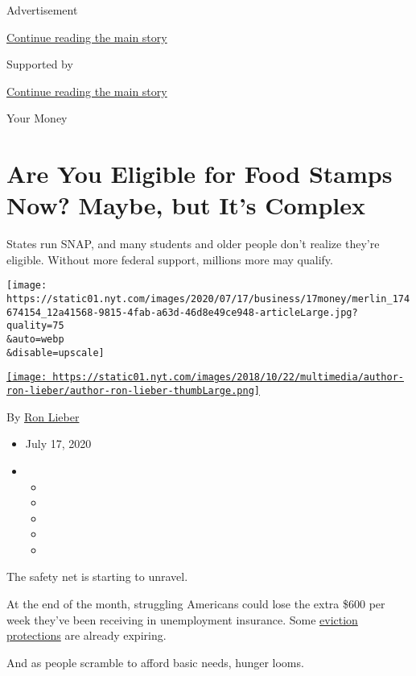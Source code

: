 Advertisement

\protect\hyperlink{after-top}{Continue reading the main story}

Supported by

\protect\hyperlink{after-sponsor}{Continue reading the main story}

Your Money

\hypertarget{are-you-eligible-for-food-stamps-now-maybe-but-its-complex}{%
\section{Are You Eligible for Food Stamps Now? Maybe, but It's
Complex}\label{are-you-eligible-for-food-stamps-now-maybe-but-its-complex}}

States run SNAP, and many students and older people don't realize
they're eligible. Without more federal support, millions more may
qualify.

\texttt{[image: https://static01.nyt.com/images/2020/07/17/business/17money/merlin\_174674154\_12a41568-9815-4fab-a63d-46d8e49ce948-articleLarge.jpg?quality=75\\\&auto=webp\\\&disable=upscale]}

\href{https://www.nytimes.com/by/ron-lieber}{\texttt{[image: https://static01.nyt.com/images/2018/10/22/multimedia/author-ron-lieber/author-ron-lieber-thumbLarge.png]}}

By \href{https://www.nytimes.com/by/ron-lieber}{Ron Lieber}

\begin{itemize}
\item
  July 17, 2020
\item
  \begin{itemize}
  \item
  \item
  \item
  \item
  \item
  \end{itemize}
\end{itemize}

The safety net is starting to unravel.

At the end of the month, struggling Americans could lose the extra \$600
per week they've been receiving in unemployment insurance. Some
\href{https://www.nytimes.com/2020/07/11/your-money/coronavirus-eviction-prevention-renters-landlord.html}{eviction
protections} are already expiring.

And as people scramble to afford basic needs, hunger looms.

